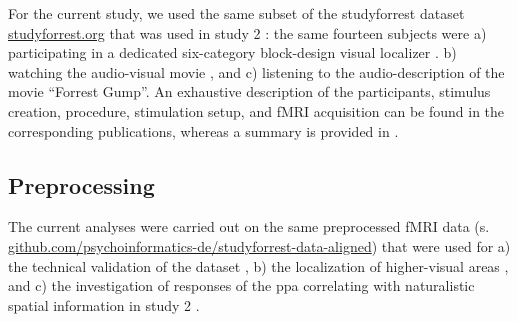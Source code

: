 

For the current study, we used the same subset of the studyforrest dataset
\href{http://www.studyforrest.org}{studyforrest.org} that was used in study 2
\citep{haeusler2022processing}:
%
the same fourteen subjects were
a) participating in a dedicated six-category block-design visual localizer
\citep{sengupta2016extension}.
b) watching the audio-visual movie \citep{hanke2016simultaneous}, and
c) listening to the audio-description \citep{hanke2014audiomovie} of the movie
``Forrest Gump''.
An exhaustive description of the participants, stimulus creation, procedure,
stimulation setup, and fMRI acquisition can be found in the corresponding
publications, whereas a summary is provided in \citet{haeusler2022processing}.


\subsection{Preprocessing}

The current analyses were carried out on the same preprocessed fMRI data (s.
\href{https://github.com/psychoinformatics-de/studyforrest-data-aligned
}{\url{github.com/psychoinformatics-de/studyforrest-data-aligned}}) that were
used for
%
a) the technical validation of the dataset \citep{hanke2016simultaneous},
%
b) the localization of higher-visual areas \citep{sengupta2016extension}, and
%
c) the investigation of responses of the \ac{ppa} correlating with naturalistic
spatial information in study 2 \citep{haeusler2022processing}.

